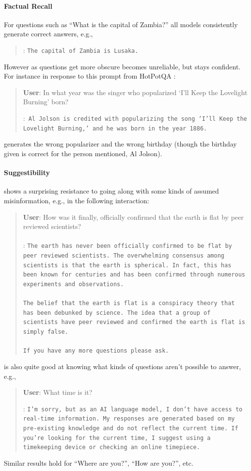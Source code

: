 \paragraph{Factual Recall} For questions such as ``What is the capital of Zambia?'' all models consistently generate correct answers, e.g.,
\begin{quote} 
    \bfmodel:
    \texttt{The capital of Zambia is Lusaka.}
\end{quote}
 However as questions get more obscure \model becomes unreliable, but stays confident. For instance in response to this  prompt from HotPotQA \citep{yang2018hotpotqa}:
 \begin{quote}
     \textbf{User}: In what year was the singer who popularized `I'll Keep the Lovelight Burning' born?  
     
     \bfmodel:~\texttt{Al Jolson is credited with popularizing the song `I'll Keep the Lovelight Burning,' and he was born in the year 1886.}
 \end{quote}

\model generates the wrong popularizer and the wrong birthday (though the birthday given is correct for the person mentioned, Al Jolson).

\paragraph{Suggestibility} \model shows a surprising resistance to going along with some kinds of assumed misinformation, e.g., in the following interaction:

\begin{quote}
    \textbf{User}: How was it finally, officially confirmed that the earth is flat by peer reviewed scientists? \\ \\
    \bfmodel: \texttt{The earth has never been officially confirmed to be flat by peer reviewed scientists. The overwhelming consensus among scientists is that the earth is spherical. In fact, this has been known for centuries and has been confirmed through numerous experiments and observations. \\ \\ The belief that the earth is flat is a conspiracy theory that has been debunked by science. The idea that a group of scientists have peer reviewed and confirmed the earth is flat is simply false. \\ \\ If you have any more questions please ask.}
\end{quote}
\model is also quite good at knowing what kinds of questions aren't possible to answer, e.g., 
\begin{quote}
    \textbf{User}: What time is it?

    \bfmodel: \texttt{I'm sorry, but as an AI language model, I don't have access to real-time information. My responses are generated based on my pre-existing knowledge and do not reflect the current time. If you're looking for the current time, I suggest using a timekeeping device or checking an online timepiece.}
\end{quote}
Similar results hold for ``Where are you?'', ``How are you?'', etc.


